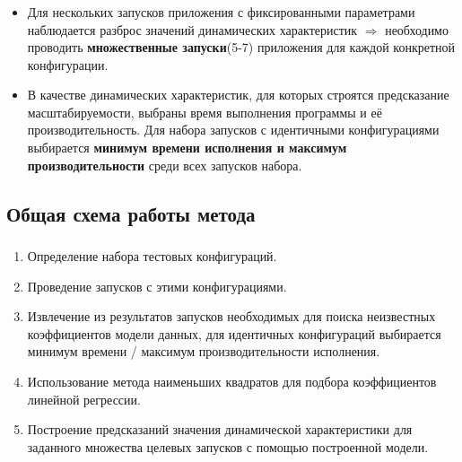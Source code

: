 \documentclass[unicode, t, 11pt]{beamer}%
\begin{document}
			\begin{frame}
				\frametitle{\insertsection}
	 			\framesubtitle{\insertsubsection}
	 			\begin{itemize}[label=\(\bullet\)]
					\item Для нескольких запусков приложения с фиксированными параметрами наблюдается разброс значений динамических характеристик \(\Rightarrow\) необходимо проводить \textbf{множественные запуски}(5-7) приложения для каждой конкретной конфигурации.
					\item В качестве динамических характеристик, для которых строятся предсказание масштабируемости, выбраны время выполнения программы и её производительность. Для набора запусков с идентичными конфигурациями выбирается \textbf{минимум времени исполнения и максимум производительности} среди всех запусков набора.
				\end{itemize}
			\end{frame}
		\subsection{Общая схема работы метода}
		\begin{frame}
			\frametitle{\insertsection}
	 		\framesubtitle{\insertsubsection}
	 		\begin{enumerate}[label=\arabic*)]
				\item Определение набора тестовых конфигураций.
				\item Проведение запусков с этими конфигурациями.
				\item Извлечение из результатов запусков необходимых для поиска неизвестных коэффициентов модели данных, для идентичных конфигураций выбирается минимум времени / максимум производительности исполнения.
				\item Использование метода наименьших квадратов для подбора коэффициентов линейной регрессии.
				\item Построение предсказаний значения динамической характеристики для заданного множества целевых запусков с помощью построенной модели.
			\end{enumerate}
		\end{frame}
\end{document}
